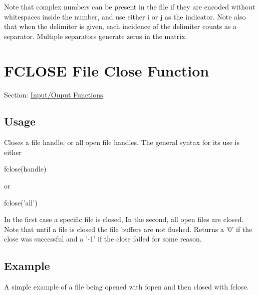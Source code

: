 Note that complex numbers can be present in the file if they are encoded without whitespaces inside the number, and use either {\ttfamily i} or {\ttfamily j} as the indicator. Note also that when the delimiter is given, each incidence of the delimiter counts as a separator. Multiple separators generate zeros in the matrix. \hypertarget{io_fclose}{}\section{F\-C\-L\-O\-S\-E File Close Function}\label{io_fclose}
Section\-: \hyperlink{sec_io}{Input/\-Ouput Functions} \hypertarget{vtkwidgets_vtkxyplotwidget_Usage}{}\subsection{Usage}\label{vtkwidgets_vtkxyplotwidget_Usage}
Closes a file handle, or all open file handles. The general syntax for its use is either \begin{DoxyVerb}  fclose(handle)
\end{DoxyVerb}
 or \begin{DoxyVerb}  fclose('all')
\end{DoxyVerb}
 In the first case a specific file is closed, In the second, all open files are closed. Note that until a file is closed the file buffers are not flushed. Returns a '0' if the close was successful and a '-\/1' if the close failed for some reason. \hypertarget{variables_struct_Example}{}\subsection{Example}\label{variables_struct_Example}
A simple example of a file being opened with {\ttfamily fopen} and then closed with {\ttfamily fclose}.


